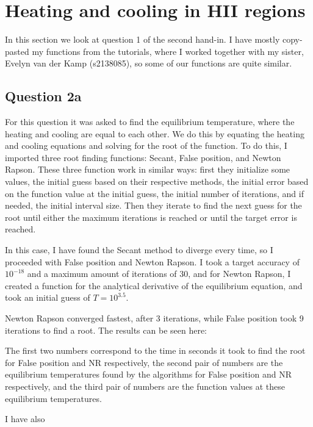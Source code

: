 \section{Heating and cooling in HII regions}

In this section we look at question 1 of the second hand-in. 
I have mostly copy-pasted my functions from the tutorials, where I worked together with my sister,
Evelyn van der Kamp (s2138085), so some of our functions are quite similar.



\subsection{Question 2a}

For this question it was asked to find the equilibrium temperature, where the heating and cooling are equal to each other.
We do this by equating the heating and cooling equations and solving for the root of the function.
To do this, I imported three root finding functions: Secant, False position, and Newton Rapson.
These three function work in similar ways: first they initialize some values, the initial guess based on their respective methods, the initial error based on the function value at the initial guess, the initial number of iterations, and if needed, the initial interval size.
Then they iterate to find the next guess for the root until either the maximum iterations is reached or until the target error is reached. 

In this case, I have found the Secant method to diverge every time, so I proceeded with False position and Newton Rapson. 
I took a target accuracy of $10^{-18}$ and a maximum amount of iterations of 30, and for Newton Rapson, I created a function for the analytical derivative of the equilibrium equation, and took an initial guess of $T = 10^{3.5}$.

Newton Rapson converged fastest, after 3 iterations, while False position took 9 iterations to find a root. 
The results can be seen here:



The first two numbers correspond to the time in seconds it took to find the root for False position and NR respectively, the second pair of numbers are the equilibrium temperatures found by the algorithms for False position and NR respectively, and the third pair of numbers are the function values at these equilibrium temperatures.

I have also 





